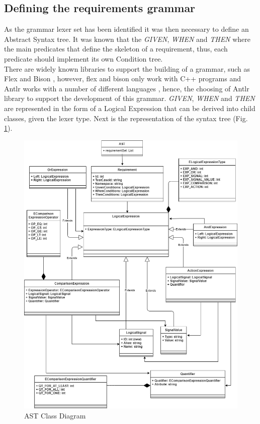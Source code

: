 \subsection{Defining the requirements grammar}
\label{sec:def_req_grammar}

As the grammar lexer set has been identified it was then necessary to define an Abstract Syntax tree. It was known that the \textit{GIVEN}, \textit{WHEN} and \textit{THEN} where the main predicates that define the skeleton of a requirement, thus, each predicate should implement its own Condition tree.\\
There are widely known libraries to support the building of a grammar, such as Flex and Bison \cite{levine_flex_2009}, however, flex and bison only work with C++ programs and Antlr works with a number of different languages \cite{antlr_site}, hence, the choosing of Antlr library to support the development of this grammar. \textit{GIVEN}, \textit{WHEN} and \textit{THEN} are represented in the form of a Logical Expression that can be derived into child classes, given the lexer type. Next is the representation of the syntax tree (Fig. \ref{fig:ast_class_diagram}).

% 
\begin{figure}[H]
    \centering
    \includegraphics[width=\textwidth]{images/grammar_class_diagram.drawio.png}
    \caption{AST Class Diagram}
    \label{fig:ast_class_diagram}
\end{figure}

